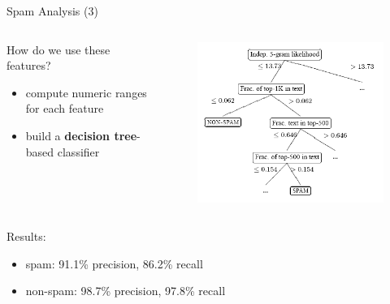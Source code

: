 \begin{frame}{Spam Analysis (3)}
\begin{columns}
	\begin{column}[r]{0.6\textwidth}
	How do we use these features?
	\begin{itemize}
	\item compute numeric ranges for each feature
	\item build a \textbf{decision tree}-based classifier
	\end{itemize}
	\end{column}

	\begin{column}[l]{0.5\textwidth}
		\begin{figure}
		\includegraphics[width=\textwidth]{img/dtree.png}
		\end{figure}
	\end{column}
\end{columns}

Results:
\begin{itemize}
	\item spam: 91.1\% precision, 86.2\% recall
	\item non-spam: 98.7\% precision, 97.8\% recall
\end{itemize}
\end{frame}
